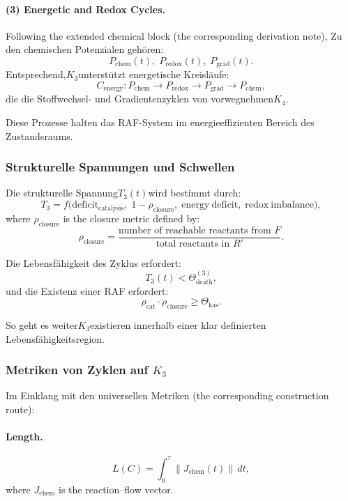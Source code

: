 \paragraph{(3) Energetic and Redox Cycles.}

Following the extended chemical block (the corresponding derivation note),
Zu den chemischen Potenzialen gehören:
\[
  P_{\mathrm{chem}}(t),\;
  P_{\mathrm{redox}}(t),\;
  P_{\mathrm{grad}}(t).
\]
Entsprechend,$K_3$unterstützt energetische Kreisläufe:
\[
  C_{\mathrm{energy}}: 
  P_{\mathrm{chem}}\to P_{\mathrm{redox}}
    \to P_{\mathrm{grad}} \to P_{\mathrm{chem}},
\]
die die Stoffwechsel- und Gradientenzyklen von vorwegnehmen$K_4$.

Diese Prozesse halten das RAF-System im energieeffizienten Bereich
des Zustandsraums.

\subsubsection{Strukturelle Spannungen und Schwellen}

Die strukturelle Spannung$T_3(t)$wird bestimmt durch:
\[
T_3 =
   f\bigl(
     \mathrm{deficit}_{\mathrm{catalysis}},\;
     1-\rho_{\mathrm{closure}},\;
     \mathrm{energy\ deficit},\;
     \mathrm{redox\ imbalance}
   \bigr),
\]
where $\rho_{\mathrm{closure}}$ is the closure metric defined by:
\[
  \rho_{\mathrm{closure}} =
    \frac{\text{number of reachable reactants from } F}
         {\text{total reactants in } R'}.
\]

Die Lebensfähigkeit des Zyklus erfordert:
\[
  T_3(t) < \Theta_{\mathrm{death}}^{(3)},
\]
und die Existenz einer RAF erfordert:
\[
  \rho_{\mathrm{cat}} \cdot \rho_{\mathrm{closure}}
  \ge \Theta_{\mathrm{kas}}.
\]

So geht es weiter$K_3$existieren innerhalb einer klar definierten Lebensfähigkeitsregion.

\subsubsection{Metriken von Zyklen auf \texorpdfstring{$K_3$}{K_3}}

Im Einklang mit den universellen Metriken (the corresponding construction route):

\paragraph{Length.}
\[
  L(C) = \int_0^\tau \|J_{\mathrm{chem}}(t)\|\, dt,
\]
where $J_{\mathrm{chem}}$ is the reaction–flow vector.

